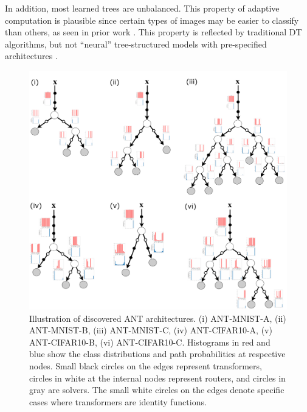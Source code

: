 In addition, most learned trees are unbalanced. This property of adaptive computation is plausible since certain types of images may be easier to classify than others, as seen in prior work \cite{Figurnov2017SpatiallyAC}. This property is reflected by traditional DT algorithms, but not ``neural'' tree-structured models with pre-specified architectures \cite{laptev2014convolutional,frosst2017distilling,kontschieder2015deep,ioannou2016decision}. 

\begin{figure}[ht]
	\center
	\includegraphics[width=\linewidth]{chapter_7/figures/trees_all.pdf}
	\caption{\footnotesize Illustration of discovered ANT architectures. (i) ANT-MNIST-A, (ii) ANT-MNIST-B, (iii) ANT-MNIST-C, (iv) ANT-CIFAR10-A, (v) ANT-CIFAR10-B, (vi) ANT-CIFAR10-C. Histograms in red and blue show the class distributions and path probabilities at respective nodes. Small black circles on the edges represent transformers, circles in white at the internal nodes represent routers, and circles in gray are solvers. The small white circles on the edges denote specific cases where transformers are identity functions.}
	\label{fig:architectures}
\end{figure}





